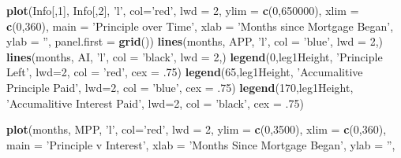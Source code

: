 \documentclass[12pt]{article}
\newenvironment{Section}[1]{}{\newpage}
\newenvironment{Shaded}{\begin{snugshade}}{\end{snugshade}}
\newcommand{\DataTypeTok}[1]{\textcolor[rgb]{0.13,0.29,0.53}{#1}}
\newcommand{\DecValTok}[1]{\textcolor[rgb]{0.00,0.00,0.81}{#1}}
\newcommand{\FloatTok}[1]{\textcolor[rgb]{0.00,0.00,0.81}{#1}}
\newcommand{\KeywordTok}[1]{\textcolor[rgb]{0.13,0.29,0.53}{\textbf{#1}}}
\newcommand{\NormalTok}[1]{#1}
\newcommand{\StringTok}[1]{\textcolor[rgb]{0.31,0.60,0.02}{#1}}
\begin{document}
\begin{Section}{Example A}
\begin{singlespace}
\begin{Shaded}
\begin{Highlighting}[]
\KeywordTok{plot}\NormalTok{(Info[,}\DecValTok{1}\NormalTok{], Info[,}\DecValTok{2}\NormalTok{], }\StringTok{'l'}\NormalTok{, }\DataTypeTok{col=}\StringTok{'red'}\NormalTok{, }\DataTypeTok{lwd =} \DecValTok{2}\NormalTok{,}
      \DataTypeTok{ylim =} \KeywordTok{c}\NormalTok{(}\DecValTok{0}\NormalTok{,}\DecValTok{650000}\NormalTok{), }\DataTypeTok{xlim =} \KeywordTok{c}\NormalTok{(}\DecValTok{0}\NormalTok{,}\DecValTok{360}\NormalTok{),}
      \DataTypeTok{main =} \StringTok{'Principle over Time'}\NormalTok{,}
      \DataTypeTok{xlab =} \StringTok{'Months since Mortgage Began'}\NormalTok{, }\DataTypeTok{ylab =} \StringTok{''}\NormalTok{,}
      \DataTypeTok{panel.first =} \KeywordTok{grid}\NormalTok{())}
\KeywordTok{lines}\NormalTok{(months, APP, }\StringTok{'l'}\NormalTok{, }\DataTypeTok{col =} \StringTok{'blue'}\NormalTok{, }\DataTypeTok{lwd =} \DecValTok{2}\NormalTok{,)}
\KeywordTok{lines}\NormalTok{(months, AI, }\StringTok{'l'}\NormalTok{, }\DataTypeTok{col =} \StringTok{'black'}\NormalTok{, }\DataTypeTok{lwd =} \DecValTok{2}\NormalTok{,)}
\KeywordTok{legend}\NormalTok{(}\DecValTok{0}\NormalTok{,leg1Height, }\StringTok{'Principle Left'}\NormalTok{, }
      \DataTypeTok{lwd=}\DecValTok{2}\NormalTok{, }\DataTypeTok{col =} \StringTok{'red'}\NormalTok{, }\DataTypeTok{cex =} \FloatTok{.75}\NormalTok{)}
\KeywordTok{legend}\NormalTok{(}\DecValTok{65}\NormalTok{,leg1Height, }\StringTok{'Accumalitive Principle Paid'}\NormalTok{, }
      \DataTypeTok{lwd=}\DecValTok{2}\NormalTok{, }\DataTypeTok{col =} \StringTok{'blue'}\NormalTok{, }\DataTypeTok{cex =} \FloatTok{.75}\NormalTok{)}
\KeywordTok{legend}\NormalTok{(}\DecValTok{170}\NormalTok{,leg1Height, }\StringTok{'Accumalitive Interest Paid'}\NormalTok{, }
      \DataTypeTok{lwd=}\DecValTok{2}\NormalTok{, }\DataTypeTok{col =} \StringTok{'black'}\NormalTok{, }\DataTypeTok{cex =} \FloatTok{.75}\NormalTok{)}
\end{Highlighting}
\end{Shaded}
\newpage
\begin{Shaded}
	\begin{Highlighting}[]
\KeywordTok{plot}\NormalTok{(months, MPP, }\StringTok{'l'}\NormalTok{, }\DataTypeTok{col=}\StringTok{'red'}\NormalTok{, }\DataTypeTok{lwd =} \DecValTok{2}\NormalTok{,}
      \DataTypeTok{ylim =} \KeywordTok{c}\NormalTok{(}\DecValTok{0}\NormalTok{,}\DecValTok{3500}\NormalTok{), }\DataTypeTok{xlim =} \KeywordTok{c}\NormalTok{(}\DecValTok{0}\NormalTok{,}\DecValTok{360}\NormalTok{), }
      \DataTypeTok{main =} \StringTok{'Principle v Interest'}\NormalTok{, }
      \DataTypeTok{xlab =} \StringTok{'Months Since Mortgage Began'}\NormalTok{, }\DataTypeTok{ylab =} \StringTok{''}\NormalTok{,}

\end{Highlighting}
\end{Shaded}
\end{singlespace}
\end{Section}
\end{document}
